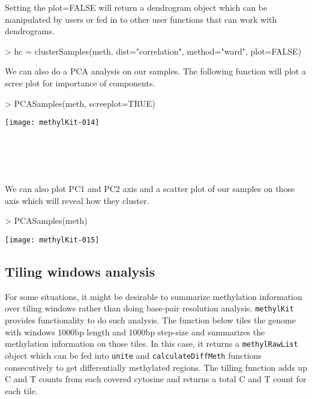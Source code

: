 \documentclass{article}
\begin{document}
Setting the plot=FALSE will return a dendrogram object which can be manipulated by users or fed in to other user functions that can work with dendrograms.
\begin{Schunk}
\begin{Sinput}
> hc = clusterSamples(meth, dist="correlation", method="ward", plot=FALSE)
\end{Sinput}
\end{Schunk}
We can also do a PCA analysis on our samples. The following function will plot a scree plot for importance of components.
\begin{center}
\begin{Schunk}
\begin{Sinput}
> PCASamples(meth, screeplot=TRUE)
\end{Sinput}
\end{Schunk}
\texttt{[image: methylKit-014]}
\end{center}
\ \\ \ \\
\ \\ \ \\
We can also plot PC1 and PC2 axis and a scatter plot of our samples on those axis which will reveal how they cluster.

\begin{center}
\begin{Schunk}
\begin{Sinput}
> PCASamples(meth)
\end{Sinput}
\end{Schunk}
\texttt{[image: methylKit-015]}
\end{center}


\subsection{Tiling windows analysis}
For some situations, it might be desirable to summarize methylation information over tiling windows rather than doing base-pair resolution analysis. \texttt{methylKit} provides functionality to do such analysis. The function below tiles the genome with windows 1000bp length and 1000bp step-size and summarizes the methylation information on those tiles. In this case, it returns a \texttt{methylRawList} object which can be fed into \texttt{unite} and \texttt{calculateDiffMeth} functions consecutively to get differentially methylated regions. The tilling function adds up C and T counts from each covered cytosine and returns a total C and T count for each tile.
\end{document}
